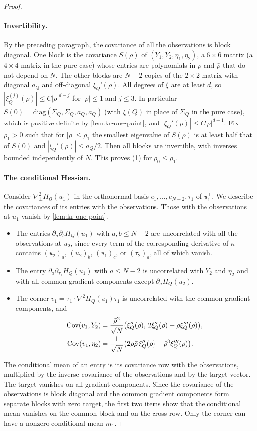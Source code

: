 \begin{proof}
\paragraph{Invertibility.}
By the preceding paragraph, the covariance of all the observations is block diagonal. One block is the covariance $S(\rho)$ of $(Y_1,Y_2,\eta_1,\eta_2)$, a $6\times6$ matrix (a $4\times4$ matrix in the pure case) whose entries are polynomials in $\rho$ and $\bar\rho$ that do not depend on $N$. The other blocks are $N-2$ copies of the $2\times2$ matrix with diagonal $a_Q$ and off-diagonal $\xi_Q'(\rho)$. All degrees of $\xi$ are at least $d$, so $|\xi_Q^{(j)}(\rho)|\le C|\rho|^{d-j}$ for $|\rho|\le1$ and $j\le3$. In particular $S(0)=\mathrm{diag}(\Sigma_Q,\Sigma_Q,a_Q,a_Q)$ (with $\xi(Q)$ in place of $\Sigma_Q$ in the pure case), which is positive definite by \cref{lem:kr-one-point}, and $|\xi_Q'(\rho)|\le C|\rho|^{d-1}$. Fix $\rho_1>0$ such that for $|\rho|\le\rho_1$ the smallest eigenvalue of $S(\rho)$ is at least half that of $S(0)$ and $|\xi_Q'(\rho)|\le a_Q/2$. Then all blocks are invertible, with inverses bounded independently of $N$. This proves (1) for $\rho_0\le\rho_1$.

\paragraph{The conditional Hessian.}
Consider $\nabla^2_\perp H_Q(u_1)$ in the orthonormal basis $e_1,\dots,e_{N-2},\tau_1$ of $u_1^\perp$. We describe the covariances of its entries with the observations. Those with the observations at $u_1$ vanish by \cref{lem:kr-one-point}.
\begin{itemize}
\item The entries $\partial_a\partial_bH_Q(u_1)$ with $a,b\le N-2$ are uncorrelated with all the observations at $u_2$, since every term of the corresponding derivative of $\kappa$ contains $(u_2)_a$, $(u_2)_b$, $(u_1)_c$, or $(\tau_2)_a$, all of which vanish.
\item The entry $\partial_a\partial_{\tau_1}H_Q(u_1)$ with $a\le N-2$ is uncorrelated with $Y_2$ and $\eta_2$ and with all common gradient components except $\partial_aH_Q(u_2)$.
\item The corner $v_1=\tau_1\cdot\nabla^2H_Q(u_1)\tau_1$ is uncorrelated with the common gradient components, and
\[
\begin{aligned}
\operatorname{Cov}(v_1,Y_2)&=\frac{\bar\rho^2}{\sqrt N}\big(\xi_Q''(\rho),\,2\xi_Q''(\rho)+\rho\xi_Q'''(\rho)\big),\\
\operatorname{Cov}(v_1,\eta_2)&=\frac1{\sqrt N}\big(2\rho\bar\rho\,\xi_Q''(\rho)-\bar\rho^3\xi_Q'''(\rho)\big).
\end{aligned}
\]
\end{itemize}
The conditional mean of an entry is its covariance row with the observations, multiplied by the inverse covariance of the observations and by the target vector. The target vanishes on all gradient components. Since the covariance of the observations is block diagonal and the common gradient components form separate blocks with zero target, the first two items show that the conditional mean vanishes on the common block and on the cross row. Only the corner can have a nonzero conditional mean $m_1$.


\end{proof}
